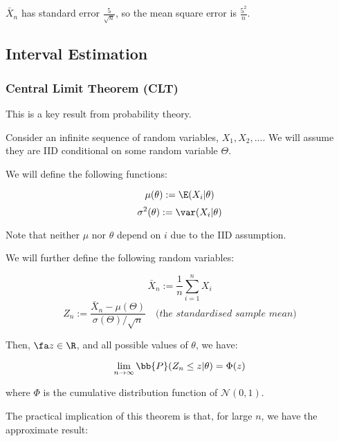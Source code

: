 \documentclass[a4paper]{article}
\begin{document}
                $\bar X_n$ has standard error $\frac{5}{\sqrt{n}}$, so the mean
                square error is $\frac{5^2}{n}$.

        \subsection{Interval Estimation}
            \begin{fread}
                [MR03, section 8.1, 8.2.1]
            \end{fread}

            \subsubsection{Central Limit Theorem (CLT)}
                This is a key result from probability theory.

                Consider an infinite sequence of random variables, $X_1, X_2,
                ...$. We will assume they are IID conditional on some random
                variable $\Theta$.

                We will define the following functions:

                \[
                    \mu(\theta) := \E(X_i | \theta)
                \]
                \[
                    \sigma^2(\theta) := \var(X_i | \theta)
                \]

                Note that neither $\mu$ nor $\theta$ depend on $i$ due to the
                IID assumption.

                We will further define the following random variables:

                \[
                    \bar X_n := \frac{1}{n} \sum_{i=1}^n X_i
                \]
                \[
                    Z_n := \frac{\bar X_n - \mu(\Theta)}{\sigma(\Theta) /
                    \sqrt{n}} \quad \textit{(the standardised sample mean)}
                \]

                Then, $\fa z \in \R$, and all possible values of $\theta$, we
                have:

                \[
                    \lim_{n \to \infty} \bb{P}(Z_n \leq z | \theta) = \Phi(z)
                \]

                where $\Phi$ is the cumulative distribution function of
                $\mathcal{N}(0, 1)$.

                The practical implication of this theorem is that, for large
                $n$, we have the approximate result:
\end{document}
